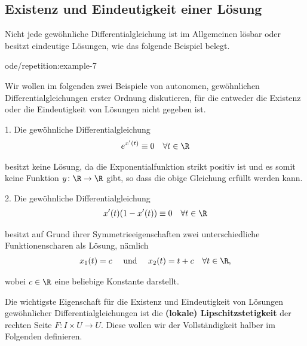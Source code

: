 \documentclass[letterpaper,10pt,english]{jupyterBook}
\begin{document}
\subsection{Existenz und Eindeutigkeit einer Lösung}
\label{\detokenize{ode/repetition:existenz-und-eindeutigkeit-einer-losung}}
\par
Nicht jede gewöhnliche Differentialgleichung ist im Allgemeinen lösbar oder besitzt eindeutige Lösungen, wie das folgende Beispiel belegt.
\begin{example}{}{ode/repetition:example-7}



\par
Wir wollen im folgenden zwei Beispiele von autonomen, gewöhnlichen Differentialgleichungen erster Ordnung diskutieren, für die entweder die Existenz oder die Eindeutigkeit von Lösungen nicht gegeben ist.

\par
1. Die gewöhnliche Differentialgleichung
\begin{align*}
e^{x'(t)} \equiv 0 \quad \forall t \in \R
\end{align*}
\par
besitzt keine Lösung, da die Exponentialfunktion strikt positiv ist und es somit keine Funktion \(y \colon \R \rightarrow \R\) gibt, so dass die obige Gleichung erfüllt werden kann.

\par
2. Die gewöhnliche Differentialgleichung
\begin{align*}
x'(t)(1-x'(t)) \equiv 0 \quad \forall t \in \R
\end{align*}
\par
besitzt auf Grund ihrer Symmetrieeigenschaften zwei unterschiedliche Funktionenscharen als Lösung, nämlich
\begin{align*}
x_1(t) = c \quad \text{ und } \quad x_2(t) = t + c \quad \forall t \in \R,
\end{align*}
\par
wobei \(c \in \R\) eine beliebige Konstante darstellt.
\end{example}

\par
Die wichtigste Eigenschaft für die Existenz und Eindeutigkeit von Lösungen gewöhnlicher Differentialgleichungen ist die \textbf{(lokale) Lipschitzstetigkeit} der rechten Seite \(F \colon I \times U \rightarrow U\).
Diese wollen wir der Vollständigkeit halber im Folgenden definieren.
\end{document}
